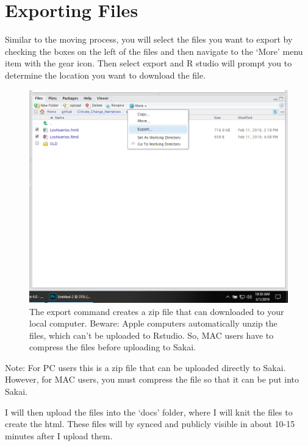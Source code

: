 \documentclass{article}\usepackage[]{graphicx}\usepackage[]{color}
\begin{document}
\section{Exporting Files}

Similar to the moving process, you will select the files you want to export by checking the boxes on the left of the files and then navigate to the `More' menu item with the gear icon. Then select export and R studio will prompt you to determine the location you want to download the file.

\begin{figure}[h]
\includegraphics[width=\textwidth]{ExportFiles}
\caption{The export command creates a zip file that can downloaded to your local computer. Beware: Apple computers automatically unzip the files, which can't be uploaded to Rstudio. So, MAC users have to compress the files before uploading to Sakai.}
\end{figure}


Note: For PC users this is a zip file that can be uploaded directly to Sakai. However, for MAC users, you must compress the file so that it can be put into Sakai. 

I will then upload the files into the `docs' folder, where I will knit the files to create the html. These files will by synced and publicly visible in about 10-15 minutes after I upload them. 
\end{document}
